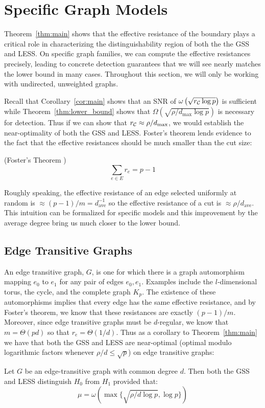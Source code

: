 \vspace{-.2cm}
\section{Specific Graph Models}
\label{sec:examples}
\vspace{-.2cm}
Theorem~\ref{thm:main} shows that the effective resistance of the boundary plays a critical role in characterizing the distinguishability region of both the the GSS and LESS.
On specific graph families, we can compute the effective resistances precisely, leading to concrete detection guarantees that we will see nearly matches the lower bound in many cases.  Throughout this section, we will only be working with undirected, unweighted graphs.%

Recall that Corollary~\ref{cor:main} shows that an SNR of $\omega\left(\sqrt{r_{\mathcal{C}} \log p}\right)$ is sufficient while Theorem~\ref{thm:lower_bound} shows that $\Omega\left(\sqrt{\rho/d_{\max} \log p}\right)$ is necessary for detection.
Thus if we can show that $r_{\mathcal{C}} \approx \rho/d_{\max}$, we would establish the near-optimality of both the GSS and LESS. 
Foster's theorem lends evidence to the fact that the effective resistances should be much smaller than the cut size:
\begin{theorem}(Foster's Theorem \cite{foster1949average,tetali1991random})
\[
\sum_{e \in E}r_e = p-1
\]
\label{thm:foster}
\end{theorem}
\vspace{-.5cm}
Roughly speaking, the effective resistance of an edge selected uniformly at random is $\approx (p-1)/m = d_{\textrm{ave}}^{-1}$ so the effective resistance of a cut is $\approx \rho/d_{\textrm{ave}}$.
This intuition can be formalized for specific models and this improvement by the average degree bring us much closer to the lower bound. 
\vspace{-.2cm}
\subsection{Edge Transitive Graphs}
An edge transitive graph, $G$, is one for which there is a graph automorphism mapping $e_0$ to $e_1$ for any pair of edges $e_0, e_1$. 
Examples include the $l$-dimensional torus, the cycle, and the complete graph $K_p$.
The existence of these automorphisms implies that every edge has the same effective resistance, and by Foster's theorem, we know that these resistances are exactly $(p-1)/m$. 
Moreover, since edge transitive graphs must be $d$-regular, we know that $m = \Theta(pd)$ so that $r_e = \Theta(1/d)$.
Thus as a corollary to Theorem~\ref{thm:main} we have that both the GSS and LESS are near-optimal (optimal modulo logarithmic factors whenever  $\rho/d \le \sqrt{p}$) on edge transitive graphs:
\begin{corollary}
Let $G$ be an edge-transitive graph with common degree $d$. Then both the GSS and LESS distinguish $H_0$ from $H_1$ provided that:
\[
\mu = \omega\left(\max\{\sqrt{\rho/d \log p}, \log p\}\right)
\]
\label{cor:edge_trans}
\end{corollary}
\vspace{-.75cm}
